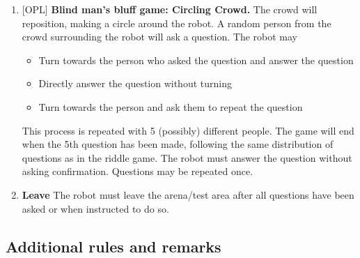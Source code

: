 \begin{enumerate}
    \setcounter{enumi}{\theenumTempSPR}
    \item {[OPL]} \textbf{Blind man's bluff game: Circling Crowd.} The crowd will reposition, making a circle around the robot. A random person from the crowd surrounding the robot will ask a question. The robot may
    \begin{itemize}
        \item Turn towards the person who asked the question and answer the question
        \item Directly answer the question without turning
        \item Turn towards the person and ask them to repeat the question
    \end{itemize}
    This process is repeated with 5 (possibly) different people.
    The game will end when the 5th question has been made, following the same distribution of questions as in the riddle game. The robot must answer the question without asking confirmation. Questions may be repeated once.

    \item \textbf{Leave} The robot must leave the arena/test area after all questions have been asked or when instructed to do so.
\end{enumerate}

\subsection{Additional rules and remarks}

